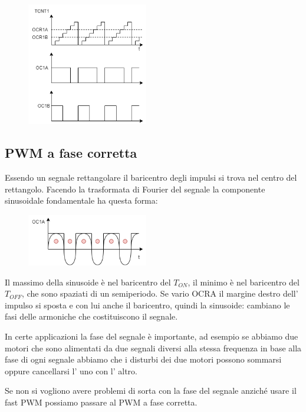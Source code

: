 \begin{figure}[H]
    \centering
    \includegraphics[width=200px]{images/19_PWM/pwm_timer_1.png}
\end{figure}

\subsection{PWM a fase corretta}
Essendo un segnale rettangolare il baricentro degli impulsi si trova nel centro del rettangolo.
Facendo la trasformata di Fourier del segnale la componente sinusoidale fondamentale ha questa forma:
\begin{figure}[H]
    \centering
    \includegraphics[width=200px]{images/19_PWM/pwm_center_of_gravity.png}
\end{figure}
Il massimo della sinusoide è nel baricentro del $T_{ON}$, il minimo è nel baricentro del $T_{OFF}$, che sono spaziati di un semiperiodo.
Se vario OCRA il margine destro dell' impulso si sposta e con lui anche il baricentro, quindi la sinusoide: cambiano le fasi delle armoniche che costituiscono il segnale.

In certe applicazioni la fase del segnale è importante, ad esempio se abbiamo due motori che sono alimentati da due segnali diversi alla stessa frequenza in base alla fase di ogni segnale abbiamo che i disturbi dei due motori possono sommarsi oppure cancellarsi l' uno con l' altro.

Se non si vogliono avere problemi di sorta con la fase del segnale anziché usare il fast PWM possiamo passare al PWM a fase corretta.

